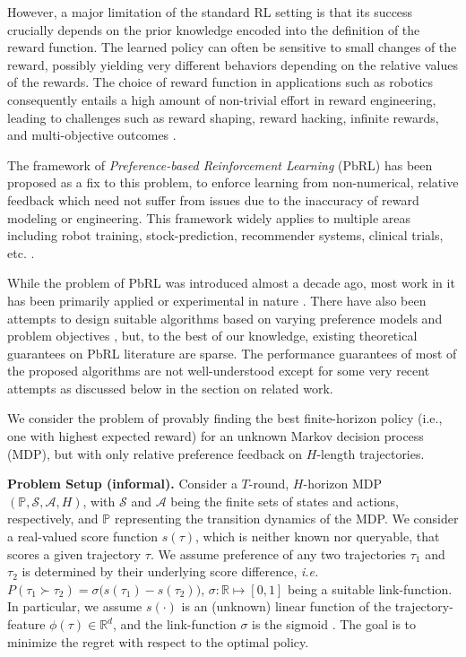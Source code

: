 However, a major limitation of the standard RL setting is that its success crucially depends on the prior knowledge encoded into the definition of the reward function. The learned policy can often be sensitive to small changes of the reward, possibly yielding very different behaviors depending on the relative values of the rewards. The choice of reward function in applications such as robotics consequently entails a high amount of non-trivial effort in reward engineering, leading to challenges such as reward shaping, reward hacking, infinite rewards, and multi-objective outcomes \citep{wirth13,wirth17}.

The framework of \emph{Preference-based Reinforcement Learning} (PbRL) \citep{busa14,wirth16,wirth17} has been proposed as a fix to this problem, to enforce learning from non-numerical, relative feedback which need not suffer from issues due to the inaccuracy of reward modeling or engineering. This framework widely applies to multiple areas including robot training, stock-prediction, recommender systems, clinical trials, etc. \citep{sui19,sadigh17,nipsPRL17,kupcsik18,jain13,wirth17}. 

While the problem of PbRL was introduced almost a decade ago, most work in it has been primarily applied or experimental in nature \citep{jain13,busa14,nipsPRL17,wirth13,wirth16,wirth17,kupcsik18}. There have also been attempts to design suitable algorithms based on varying preference models and problem objectives \citep{sui19,xu20}, but, to the best of our knowledge, existing theoretical guarantees on PbRL literature are sparse. The performance guarantees of most of the proposed algorithms are not well-understood \citep{wirth17,xu20} except for some very recent attempts \citep{sui19,xu20} as discussed below in the section on related work. 

We consider the problem of provably finding the best finite-horizon policy (i.e., one with highest expected reward) for an unknown Markov decision process (MDP), but with only relative preference feedback on $H$-length trajectories.

\textbf{Problem Setup (informal). } Consider a $T$-round, $H$-horizon MDP $(\mathbb P, \mathcal S, \mathcal A, H)$, with ${\mathcal S}$ and ${\mathcal A}$ being the finite sets of states and actions, respectively, and $\mathbb P$ representing the transition dynamics of the MDP. We consider a real-valued score function $s(\tau)$, which is neither known nor queryable, that scores a given trajectory $\tau$. We assume preference of any two trajectories $\tau_1$ and $\tau_2$ is determined by their underlying score difference, \emph{i.e.}$P(\tau_1 \succ \tau_2) = \sigma\big( s(\tau_1) - s(\tau_2) \big)$, $\sigma: {\mathbb R} \mapsto [0,1]$ being a suitable link-function. In particular, we assume $s(\cdot)$ is an (unknown) linear function of the trajectory-feature $\phi(\tau) \in {\mathbb R}^d$, and the link-function $\sigma$ is the sigmoid \cite{li17}. {The goal is to minimize the regret with respect to the optimal policy}. 

